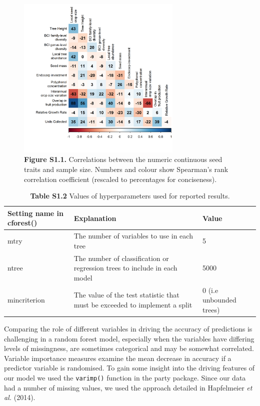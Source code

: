 \documentclass[11pt]{article}
\begin{document}
\begin{figure}[H]
\centering\includegraphics[width=0.7\textwidth]{../Figures/TraitCorrelation.png} 
\caption[]{ \textbf{Figure S1.1.} Correlations between the numeric continuous seed traits and sample size. Numbers and colour show Spearman’s rank correlation coefficient (rescaled to percentages for conciseness). }
\end{figure}


\begin{table}[]
\caption{\textbf{Table S1.2} Values of hyperparameters used for reported results. }
\small
\begin{tabular}{@{}lp{2in}l@{}}
\toprule
Setting name in cforest() & Explanation                                                                & Value                   \\ \midrule
mtry                      & The number of variables to use in each tree                                & 5                       \\
ntree                     & The number of classification or regression trees to include in each model  & 5000                    \\
mincriterion              & The value of the test statistic that must be exceeded to implement a split & 0 (i.e unbounded trees) \\ \bottomrule
\end{tabular}
\end{table}

Comparing the role of different variables in driving the accuracy of predictions is challenging in a random forest model, especially when the variables have differing levels of missingness, are sometimes categorical and may be somewhat correlated. Variable importance measures examine the mean decrease in accuracy if a predictor variable is randomised. To gain some insight into the driving features of our model we used the \texttt{varimp()} function in the party package. Since our data had a number of missing values, we used the approach detailed in Hapfelmeier \emph{et al. }(2014).
\end{document}
